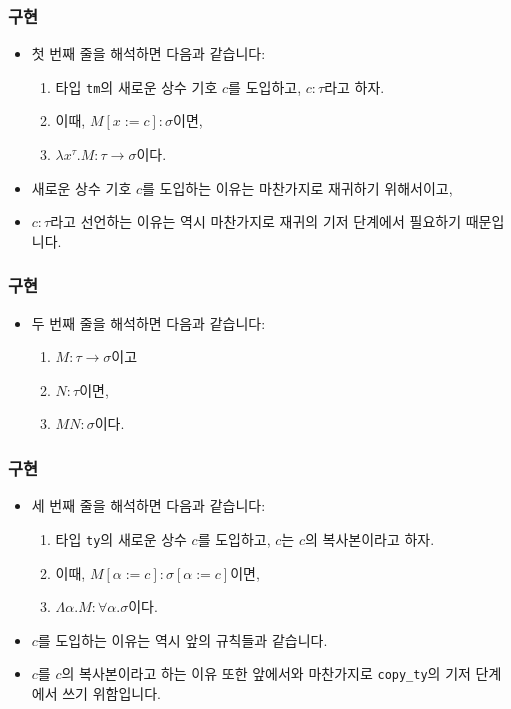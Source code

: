 \documentclass[slidestop,compress,mathserif]{beamer}
\begin{document}
    \begin{frame}
        \frametitle{구현}
        \begin{itemize}
            \item 첫 번째 줄을 해석하면 다음과 같습니다:
            \begin{enumerate}
                \item 타입 \texttt{tm}의 새로운 상수 기호 $c$를 도입하고, $c : \tau$라고 하자.
                \item 이때, $M \left[ x := c \right] : \sigma$이면,
                \item $\lambda x^{\tau} . M : \tau \to \sigma$이다.
            \end{enumerate}
            \item 새로운 상수 기호 $c$를 도입하는 이유는 마찬가지로 재귀하기 위해서이고,
            \item $c : \tau$라고 선언하는 이유는 역시 마찬가지로 재귀의 기저 단계에서 필요하기 때문입니다.
        \end{itemize}
    \end{frame}

    \begin{frame}
        \frametitle{구현}
        \begin{itemize}
            \item 두 번째 줄을 해석하면 다음과 같습니다:
            \begin{enumerate}
                \item $M : \tau \to \sigma$이고
                \item $N : \tau$이면,
                \item $M N : \sigma$이다.
            \end{enumerate}
        \end{itemize}
    \end{frame}

    \begin{frame}
        \frametitle{구현}
        \begin{itemize}
            \item 세 번째 줄을 해석하면 다음과 같습니다:
            \begin{enumerate}
                \item 타입 \texttt{ty}의 새로운 상수 $c$를 도입하고, $c$는 $c$의 복사본이라고 하자.
                \item 이때, $M \left[ \alpha := c \right] : \sigma \left[ \alpha := c \right]$이면,
                \item $\Lambda \alpha . M : \forall \alpha . \sigma$이다.
            \end{enumerate}
            \item $c$를 도입하는 이유는 역시 앞의 규칙들과 같습니다.
            \item $c$를 $c$의 복사본이라고 하는 이유 또한 앞에서와 마찬가지로 \texttt{copy\_ty}의 기저 단계에서 쓰기 위함입니다.
        \end{itemize}
    \end{frame}
\end{document}
